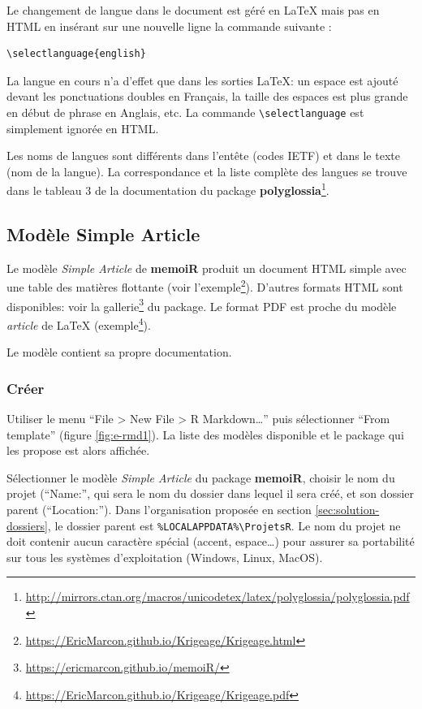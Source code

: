 \documentclass[
  12pt,
  french,
  a4paper,
  extrafontsizes,onecolumn,openright
  ]{memoir}
\begin{document}
Le changement de langue dans le document est géré en LaTeX mais pas en HTML en insérant sur une nouvelle ligne la commande suivante :

\begin{verbatim}
\selectlanguage{english}
\end{verbatim}

La langue en cours n'a d'effet que dans les sorties LaTeX: un espace est ajouté devant les ponctuations doubles en Français, la taille des espaces est plus grande en début de phrase en Anglais, etc.
La commande \texttt{\textbackslash{}selectlanguage} est simplement ignorée en HTML.

Les noms de langues sont différents dans l'entête (codes IETF) et dans le texte (nom de la langue).
La correspondance et la liste complète des langues se trouve dans le tableau 3 de la documentation du package \textbf{polyglossia}\footnote{\url{http://mirrors.ctan.org/macros/unicodetex/latex/polyglossia/polyglossia.pdf}}.

\hypertarget{sec:memo}{%
\subsection{Modèle Simple Article}\label{sec:memo}}

Le modèle \emph{Simple Article} de \textbf{memoiR} produit un document HTML simple avec une table des matières flottante (voir l'exemple\footnote{\url{https://EricMarcon.github.io/Krigeage/Krigeage.html}}).
D'autres formats HTML sont disponibles: voir la gallerie\footnote{\url{https://ericmarcon.github.io/memoiR/}} du package.
Le format PDF est proche du modèle \emph{article} de LaTeX (exemple\footnote{\url{https://EricMarcon.github.io/Krigeage/Krigeage.pdf}}).

Le modèle contient sa propre documentation.

\hypertarget{cruxe9er}{%
\subsubsection{Créer}\label{cruxe9er}}

Utiliser le menu \enquote{File \textgreater{} New File \textgreater{} R Markdown\ldots{}} puis sélectionner \enquote{From template} (figure \ref{fig:e-rmd1}).
La liste des modèles disponible et le package qui les propose est alors affichée.

Sélectionner le modèle \emph{Simple Article} du package \textbf{memoiR}, choisir le nom du projet (\enquote{Name:}, qui sera le nom du dossier dans lequel il sera créé, et son dossier parent (\enquote{Location:}).
Dans l'organisation proposée en section \ref{sec:solution-dossiers}, le dossier parent est \texttt{\%LOCALAPPDATA\%\textbackslash{}ProjetsR}.
Le nom du projet ne doit contenir aucun caractère spécial (accent, espace\ldots) pour assurer sa portabilité sur tous les systèmes d'exploitation (Windows, Linux, MacOS).
\end{document}
